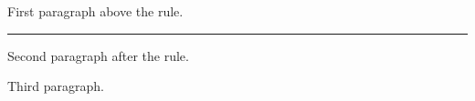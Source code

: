 %
%
\vsize=180pt
\hsize=4in
\noindent First paragraph above the rule.
\par
\hrule
\noindent Second paragraph after the rule.
\par
\noindent Third paragraph.
\par
\eject
\bye
